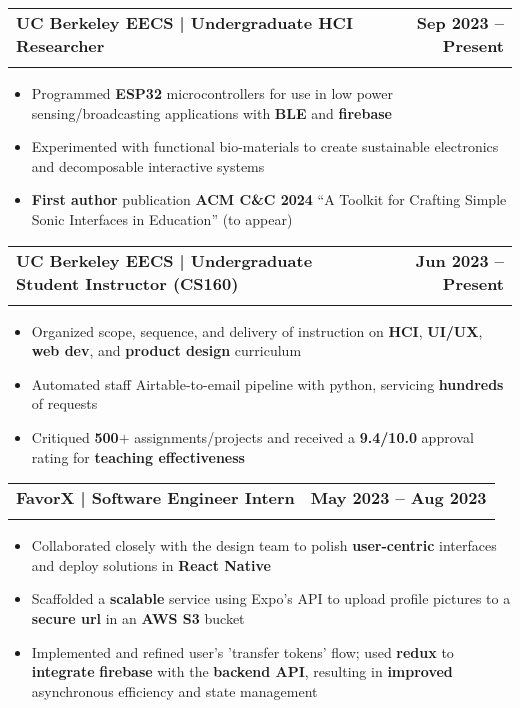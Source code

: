 \documentclass[letterpaper,11pt]{article}
\makeatletter
\newcommand{\resumeItem}[1]{
  
  \item\small{
    {#1 \vspace{3pt}}
  }
}
\newcommand{\resumeSubheading}[4]{
  \vspace{-2pt}\item
    \begin{tabular*}{1.0\textwidth}[t]{l@{\extracolsep{\fill}}r}
      \vspace{-1pt}
      \textbf{\normalsize #1} & \textbf{\small #2} \\ 
      \textit{\small#3} & \textit{\small #4} \\
    \end{tabular*}\vspace{-7pt}
}
\newcommand{\resumeItemListStart}{\begin{itemize}}
\newcommand{\resumeItemListEnd}{\end{itemize}\vspace{-2pt}}
\makeatother
\begin{document}
  \resumeSubheading
    {UC Berkeley EECS | Undergraduate HCI Researcher}{Sep 2023 -- Present}{}{}
    \vspace{-15pt}
    \resumeItemListStart
      \resumeItem{Programmed \textbf{ESP32} microcontrollers for use in low power sensing/broadcasting applications with \textbf{BLE} and \textbf{firebase}}
      \resumeItem{Experimented with functional bio-materials to create sustainable electronics and decomposable interactive systems}
      \resumeItem{\textbf{First author} publication \textbf{ACM C\&C 2024} ``A Toolkit for Crafting Simple Sonic Interfaces in Education'' (to appear)}
    \resumeItemListEnd

    \resumeSubheading
    {UC Berkeley EECS | Undergraduate Student Instructor (CS160)}{Jun 2023 -- Present}{}{}
    \vspace{-15pt}
    \resumeItemListStart
    \resumeItem{Organized scope, sequence, and delivery of instruction on \textbf{HCI}, \textbf{UI/UX}, \textbf{web dev}, and \textbf{product design} curriculum}
    \resumeItem{Automated staff Airtable-to-email pipeline with python, servicing \textbf{hundreds} of requests}
    \resumeItem{Critiqued \textbf{500}$+$ assignments/projects and received a \textbf{9.4/10.0}  approval rating for \textbf{teaching effectiveness}}
    \resumeItemListEnd

    \resumeSubheading
    {FavorX | Software Engineer Intern}{May 2023 -- Aug 2023}{}{}
    \vspace{-15pt}
    \resumeItemListStart
    \resumeItem{Collaborated closely with the design team to polish \textbf{user-centric} interfaces and deploy solutions in \textbf{React Native}}
    \resumeItem{Scaffolded a \textbf{scalable} service using Expo's API to upload profile pictures to a \textbf{secure url} in an \textbf{AWS S3} bucket}
    \resumeItem{Implemented and refined user's 'transfer tokens' flow; used \textbf{redux} to  \textbf{integrate} \textbf{firebase} with the \textbf{backend API}, resulting in \textbf{improved} asynchronous efficiency and state management}
    \resumeItemListEnd
\end{document}
